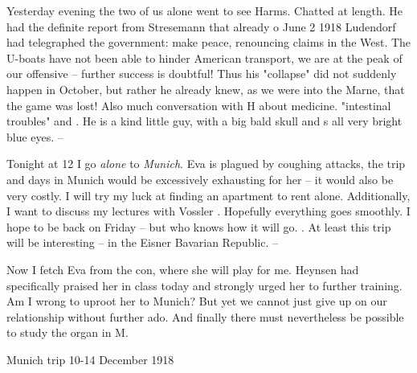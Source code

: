 
Yesterday evening the two of us alone went to see Harms. Chatted at length. He had the definite report from Stresemann that already o June 2 1918 Ludendorf had telegraphed the government:
 make peace, renouncing claims in the West. The U-boats have not been able to hinder American transport, we are at the peak of our offensive -- further success is doubtful! Thus his "collapse" did not suddenly happen in October, but rather he already knew, as we were  into the Marne, that the game was lost! Also much conversation with H about medicine.  "intestinal troubles" and . He is a kind little guy, with a big bald skull and s
all very bright blue eyes.  --

Tonight at 12 I go \textit{alone} to \textit{Munich}. Eva is plagued by coughing attacks, the trip and days in Munich would be excessively exhausting for her -- it would also be very costly. I will try my luck at finding an apartment to rent alone. Additionally, I want to discuss my lectures with Vossler . Hopefully everything goes smoothly. I hope to be back on Friday -- but who knows how it will go. . At least this trip will be interesting -- in the Eisner Bavarian Republic. --

\missing

Now I fetch Eva from the con, where she will play for me. Heynsen had specifically praised her in class today and strongly urged her to further training. Am I wrong to uproot her to Munich? But yet we cannot just give up on our relationship without further ado. And finally there must nevertheless be possible to study the organ in M.

\missing

Munich trip 10-14 December 1918

